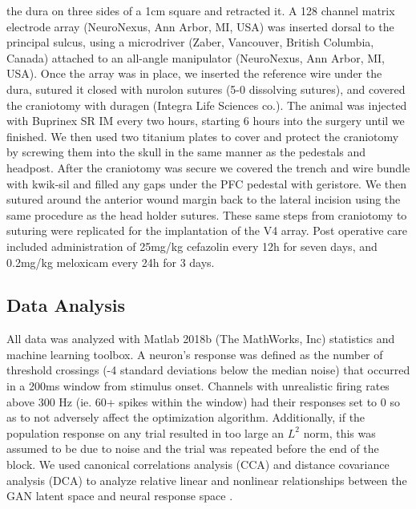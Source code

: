 the dura on three sides of a 1cm square and retracted it. A 128 channel matrix electrode array (NeuroNexus, Ann Arbor, MI, USA) was inserted dorsal to the principal sulcus, using a microdriver (Zaber, Vancouver, British Columbia, Canada) attached to an all-angle manipulator (NeuroNexus, Ann Arbor, MI, USA). Once the array was in place, we inserted the reference wire under the dura, sutured it closed with nurolon sutures (5-0 dissolving sutures), and covered the craniotomy with duragen (Integra Life Sciences co.). The animal was injected with Buprinex SR IM every two hours, starting 6 hours into the surgery until we finished. We then used two titanium plates to cover and protect the craniotomy by screwing them into the skull in the same manner as the pedestals and headpost. After the craniotomy was secure we covered the trench and wire bundle with kwik-sil and filled any gaps under the PFC pedestal with geristore. We then sutured around the anterior wound margin back to the lateral incision using the same procedure as the head holder sutures. These same steps from craniotomy to suturing were replicated for the implantation of the V4 array. Post operative care included administration of 25mg/kg cefazolin every 12h for seven days, and 0.2mg/kg meloxicam every 24h for 3 days.
\\

\subsection{Data Analysis}
\hspace*{10mm}All data was analyzed with Matlab 2018b (The MathWorks, Inc) statistics and machine learning toolbox. A neuron's response was defined as the number of threshold crossings (-4 standard deviations below the median noise) that occurred in a 200ms window from stimulus onset. Channels with unrealistic firing rates above 300 Hz (ie. 60+ spikes within the window) had their responses set to 0 so as to not adversely affect the optimization algorithm. Additionally, if the population response on any trial resulted in too large an $L^2$ norm, this was assumed to be due to noise and the trial was repeated before the end of the block. We used canonical correlations analysis (CCA) and distance covariance analysis (DCA) to analyze relative linear and nonlinear relationships between the GAN latent space and neural response space \cite{Cowley2017b}. 




